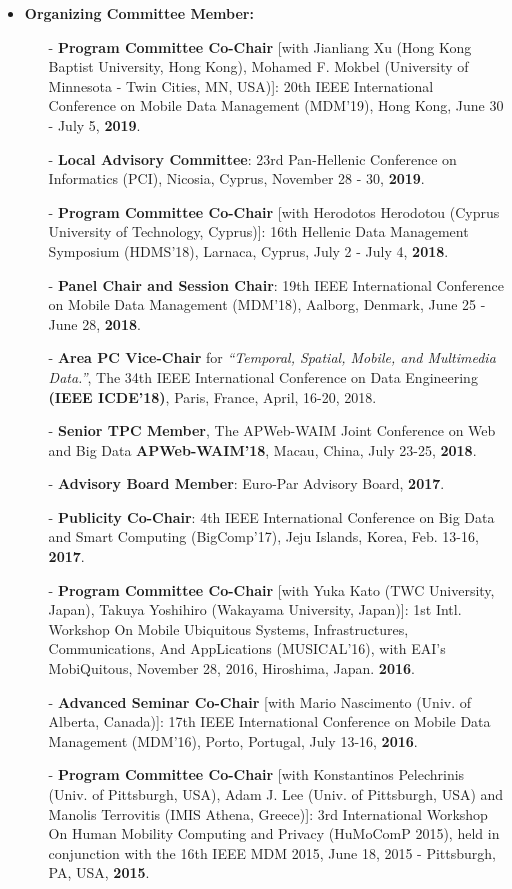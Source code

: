 \documentclass[10pt]{article}
\begin{document}
\begin{itemize}
\item {\bf Organizing Committee Member:}
\begin{itemize}
\setlength{\itemsep}{0.10ex}
\item[-] {\bf Program Committee Co-Chair} [with Jianliang Xu (Hong Kong Baptist University, Hong Kong), Mohamed F. Mokbel (University of Minnesota - Twin Cities, MN, USA)]: 20th IEEE International Conference on Mobile Data Management (MDM'19), Hong Kong, June 30 - July 5, {\bf 2019}.
\item[-] {\bf Local Advisory Committee}: 23rd Pan-Hellenic Conference on Informatics (PCI), Nicosia, Cyprus, November 28 - 30, {\bf 2019}.
\item[-] {\bf Program Committee Co-Chair} [with Herodotos Herodotou (Cyprus University of Technology, Cyprus)]: 16th Hellenic Data Management Symposium (HDMS'18), Larnaca, Cyprus, July 2 - July 4, {\bf 2018}.
\item[-] {\bf Panel Chair and Session Chair}: 19th IEEE International Conference on Mobile Data Management (MDM'18), Aalborg, Denmark, June 25 - June 28, {\bf 2018}.
\item[-] {\bf Area PC Vice-Chair} for {\em ``Temporal, Spatial, Mobile, and Multimedia Data.''}, The 34th IEEE International Conference on Data Engineering {\bf (IEEE ICDE'18)}, Paris, France, April, 16-20, 2018.
\item[-] {\bf Senior TPC Member}, The APWeb-WAIM Joint Conference on Web and Big Data {\bf APWeb-WAIM'18}, Macau, China, July 23-25, {\bf 2018}.
\item[-] {\bf Advisory Board Member}: Euro-Par Advisory Board, {\bf 2017}.
\item[-] {\bf Publicity Co-Chair}: 4th IEEE International Conference on Big Data and Smart Computing (BigComp'17), Jeju Islands, Korea, Feb. 13-16, {\bf 2017}.
\item[-] {\bf Program Committee Co-Chair} [with Yuka Kato (TWC University, Japan), Takuya Yoshihiro (Wakayama University, Japan)]:  1st Intl. Workshop On Mobile Ubiquitous Systems, Infrastructures, Communications, And AppLications (MUSICAL'16), with EAI's MobiQuitous, November 28, 2016, Hiroshima, Japan. {\bf 2016}.
\item[-] {\bf Advanced Seminar Co-Chair} [with Mario Nascimento (Univ. of Alberta, Canada)]: 17th IEEE International Conference on Mobile Data Management (MDM'16), Porto, Portugal, July 13-16, {\bf 2016}.
\item[-] {\bf Program Committee Co-Chair} [with Konstantinos Pelechrinis (Univ. of Pittsburgh, USA), Adam J. Lee (Univ. of Pittsburgh, USA) and Manolis Terrovitis (IMIS Athena, Greece)]:  3rd International Workshop On Human Mobility Computing and Privacy (HuMoComP 2015), held in conjunction with the 16th IEEE MDM 2015, June 18, 2015 - Pittsburgh, PA, USA, {\bf 2015}.

\end{itemize}
\end{itemize}
\end{document}
